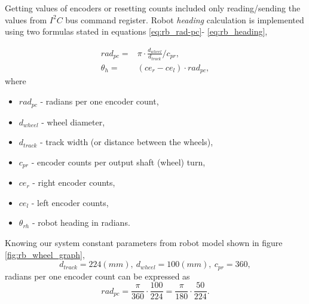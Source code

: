 Getting values of encoders or resetting counts included only reading/sending the values from  $I^2C$ bus command register.
Robot \textit{heading} calculation is implemented using two formulas stated in equations \ref{eq:rb_rad-pc}- \ref{eq:rb_heading},

\begin{eqnarray}
rad_{pc}  = & \pi \cdot \frac{ d_{wheel} }{ d_{track} } / c_{pr}	,
\label{eq:rb_rad-pc}
\\
\theta_{h} = & (ce_{r} - ce_{l} ) \cdot rad_{pc} ,
\label{eq:rb_heading}
\end{eqnarray}
where 
\begin{itemize}
	\item $rad_{pc}$ - radians per one encoder count,
	\item $d_{wheel}$ - wheel diameter,
	\item $d_{track}$ - track width (or distance between the wheels), %
	\item $c_{pr}$ - encoder counts per output shaft (wheel) turn,
	\item $ce_{r}$ - right encoder counts,
	\item $ce_{l}$ - left encoder counts,
	\item $\theta_{rh}$ - robot heading in radians.
\end{itemize}

Knowing our system constant parameters from robot model shown in figure \ref{fig:rb_wheel_graph},
$$
d_{track} = 224 (mm), \ d_{wheel}=100 (mm), \ c_{pr}=360,
$$
radians per one encoder count can be expressed as
$$
rad_{pc}  = \frac{\pi}{360}\cdot \frac{ 100 }{ 224 } = \frac{\pi}{180}\cdot \frac{ 50 }{ 224 }.
$$

